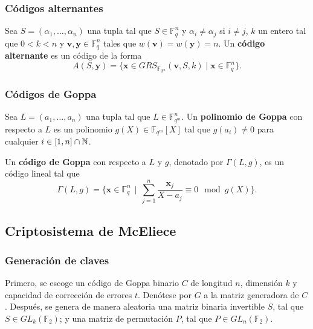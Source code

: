 \subsubsection{Códigos alternantes}

\begin{definition}
	Sea $S = (\alpha_1, \dots, \alpha_n)$ una tupla tal que $S \in \mathbb{F}_q^n$ y $\alpha_i \neq \alpha_j$ si $i \neq j$, $k$ un entero tal que $0 < k < n$ y $\textbf{v}, \textbf{y} \in \mathbb{F}_q^n$ tales que $w(\textbf{v}) = w(\textbf{y}) = n$. Un \textbf{código alternante} es un código de la forma
	\[A(S, \textbf{y}) = \big\{ \textbf{x}\in GRS_{\mathbb{F}_{q^m}}(\textbf{v}, S, k) \mid \textbf{x} \in \mathbb{F}_q^n \big\}.\]
\end{definition}

\subsubsection{Códigos de Goppa}

\begin{definition}
	Sea $L = (a_1, \dots, a_n)$ una tupla tal que $L \in \mathbb{F}_{q^m}^n$. Un \textbf{polinomio de Goppa} con respecto a $L$ es un polinomio $g(X) \in \mathbb{F}_{q^m}[X]$ tal que $g(a_i) \neq 0$ para cualquier $i \in [1, n] \cap \mathbb{N}$.
\end{definition}

\begin{definition}
	Un \textbf{código de Goppa} con respecto a $L$ y $g$, denotado por $\Gamma(L, g)$, es un código lineal tal que
	\[\Gamma(L, g) = \bigg\{\textbf{x} \in \mathbb{F}_q^n \ \ \bigg|\ \ \sum_{j=1}^n \frac{\textbf{x}_j}{X - a_j} \equiv 0 \mod g(X)\bigg\}.\]
\end{definition}


\subsection{Criptosistema de McEliece}

\subsubsection{Generación de claves}

Primero, se escoge un código de Goppa binario $C$ de longitud $n$, dimensión $k$ y capacidad de corrección de errores $t$. Denótese por $G$ a la matriz generadora de $C$. Después, se genera de manera aleatoria una matriz binaria invertible $S$, tal que $S \in GL_k(\mathbb{F}_2)$; y una matriz de permutación $P$, tal que $P \in GL_n(\mathbb{F}_2)$.

